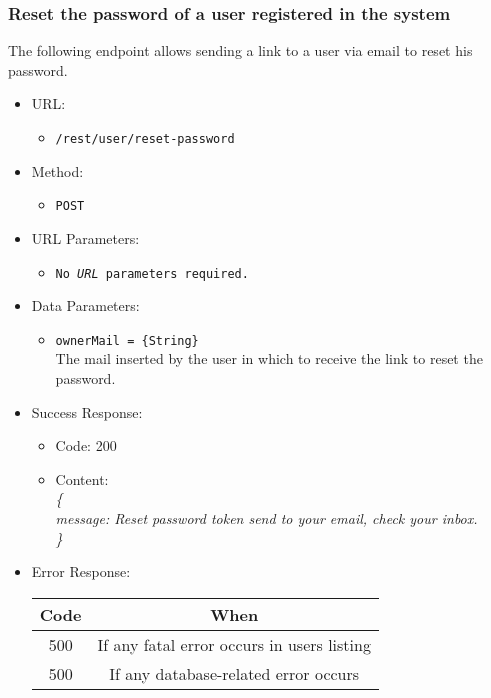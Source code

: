 \newpage
\subsubsection*{Reset the password of a user registered in the system}

The following endpoint allows sending a link to a user via email to reset his password.

\begin{itemize}

    \item URL:
    \begin{itemize}
        \item \texttt{/rest/user/reset-password}
    \end{itemize}

    \item Method:
    \begin{itemize}
        \item \texttt{POST}
    \end{itemize}

    \item URL Parameters:
    \begin{itemize}
        \item \texttt{No \textit{URL} parameters required.}
    \end{itemize}

    \item Data Parameters:
    \begin{itemize}
        \item \texttt{ownerMail = \{String\}} \\
        The mail inserted by the user in which to receive the link to reset the password.
    \end{itemize}

    \item Success Response:
    \begin{itemize}
        \item Code: 200
        \item Content: \\
        \textit{
\{ \\
message: Reset password token send to your email, check your inbox. \\
\}
        }
    \end{itemize}

    \item Error Response:
    \begin{table}[!h]
    \centering
    \begin{tabular}{|c|c|}
    \hline
    \multicolumn{1}{|c|}{\textbf{Code}} & \multicolumn{1}{c|}{\textbf{When}} \\ \hline
    500 & If any fatal error occurs in users listing \\\hline
    500 & If any database-related error occurs \\\hline
    \end{tabular}
    \end{table}

\end{itemize}


